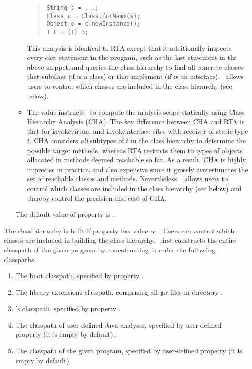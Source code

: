 \begin{itemize}
\begin{itemize}
\begin{quote}
\begin{verbatim}
String s = ...;
Class c = Class.forName(s);
Object o = c.newInstance();
T t = (T) o;
\end{verbatim}
\end{quote}

This analysis is identical to RTA except that it additionally inspects every cast statement in the program,
such as the last statement in the above snippet,
and queries the class hierarchy to find all concrete classes that subclass  (if  is a class)
or that implement  (if  is an interface).
\Chord\ allows users to control which classes are included in the class hierarchy (see below).

\item
The  value instructs \Chord\ to compute the analysis scope statically using Class Hierarchy Analysis (CHA).
The key difference between CHA and RTA is that for invokevirtual and invokeinterface sites with receiver of
static type $t$, CHA considers {\it all} subtypes of $t$ in the class hierarchy to determine the possible
target methods, whereas RTA restricts them to types of objects allocated in methods deemed reachable so far.
As a result, CHA is highly imprecise in practice, and also expensive since it grossly overestimates the set
of reachable classes and methods.
Nevertheless, \Chord\ allows users to control which classes are included in the class hierarchy (see below)
and thereby control the precision and cost of CHA.

\end{itemize}
The default value of property  is .
\end{itemize}

The class hierarchy is built if property  has value  or .
Users can control which classes are included in building the class hierarchy.
\Chord\ first constructs the entire classpath of the given program by concatenating in order the following
classpaths:

\begin{enumerate}
\item
The boot classpath, specified by property .
\item
The library extensions classpath, comprising all jar files in directory .
\item
\Chord's classpath, specified by property .
\item
The classpath of user-defined Java analyses, specified by user-defined property 
(it is empty by default).
\item
The classpath of the given program, specified by user-defined property 
(it is empty by default).
\end{enumerate}

